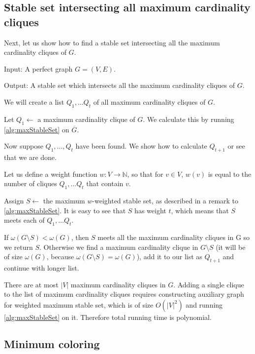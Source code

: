 \subsection{Stable set intersecting all maximum cardinality cliques}
Next, let us show how to find a stable set intersecting all the maximum cardinality cliques of $G$.
\begin{alg}
  \label{alg:ssIntersectingCliques}
  Input: A perfect graph $G = (V, E)$.

  \noindent Output: A stable set which intersects all the maximum cardinality cliques of $G$.
\end{alg}
\begin{algtext2}
  We will create a list $Q_1, \ldots Q_t$ of all maximum cardinality cliques of $G$.

  Let $Q_1 \leftarrow$ a maximum cardinality clique of $G$. We calculate this by running \cref{alg:maxStableSet} on $\overline{G}$.

  Now suppose $Q_1, \ldots, Q_t$ have been found. We show how to calculate $Q_{t+1}$ or see that we are done.

  Let us define a weight function $w : V \rightarrow \mathbb{N}$, so that for $v \in V$, $w(v)$ is equal to the number of cliques $Q_1, \ldots Q_t$ that contain $v$.

  Assign $S \leftarrow$ the maximum $w$-weighted stable set, as described in a remark to \cref{alg:maxStableSet}. It is easy to see that $S$ has weight $t$, which means that $S$ meets each of $Q_1, \ldots Q_t$.

  If $\omega(G \setminus S) < \omega(G)$, then $S$ meets all the maximum cardinality cliques in G so we return $S$. Otherwise we find a maximum cardinality clique in $G \setminus S$ (it will be of size $\omega(G)$, because $\omega(G \setminus S) = \omega(G)$), add it to our list as $Q_{t+1}$ and continue with longer list.

\end{algtext2}

There are at most $|V|$ maximum cardinality cliques in $G$. Adding a single clique to the list of maximum cardinality cliques requires constructing auxiliary graph for weighted maximum stable set, which is of size $O(|V|^2)$ and running \cref{alg:maxStableSet} on it. Therefore total running time is polynomial.

\subsection{Minimum coloring}

